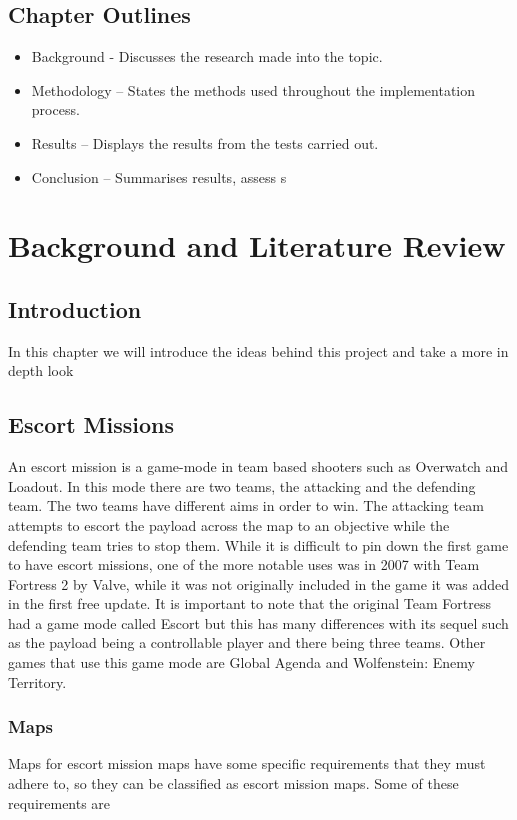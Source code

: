 \documentclass{article}
\begin{document}
\subsection{Chapter Outlines}
\begin{itemize}
	\item Background - Discusses the research made into the topic.
	\item Methodology – States the methods used throughout the implementation process.
	\item Results – Displays the results from the tests carried out.
	\item Conclusion – Summarises results, assess s	
\end{itemize}
\newpage
\section{Background and Literature Review}
\subsection{Introduction}
In this chapter we will introduce the ideas behind this project and take a more in depth look  
\subsection{Escort Missions}
An escort mission is a game-mode in team based shooters such as Overwatch and Loadout. In this mode there are two teams, the attacking and the defending team. The two teams have different aims in order to win. The attacking team attempts to escort the payload across the map to an objective while the defending team tries to stop them. While it is difficult to pin down the first game to have escort missions, one of the more notable uses was in 2007 with Team Fortress 2 by Valve, while it was not originally included in the game it was added in the first free update. It is important to note that the original Team Fortress had a game mode called Escort but this has many differences with its sequel such as the payload being a controllable player and there being three teams. Other games that use this game mode are Global Agenda and Wolfenstein: Enemy Territory.    
\subsubsection{Maps}
Maps for escort mission maps have some specific requirements that they must adhere to, so they can be classified as escort mission maps. Some of these requirements are 
\end{document}
